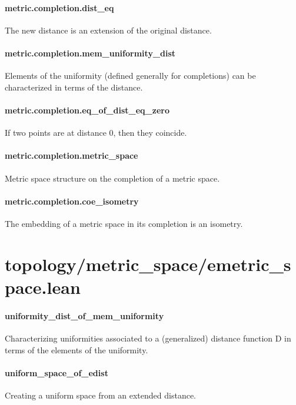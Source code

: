 \documentclass{article}
\begin{document}
\paragraph{metric.completion.dist\_eq}
\par
The new distance is an extension of the original distance.
\paragraph{metric.completion.mem\_uniformity\_dist}
\par
Elements of the uniformity (defined generally for completions) can be characterized in terms
of the distance.
\paragraph{metric.completion.eq\_of\_dist\_eq\_zero}
\par
If two points are at distance 0, then they coincide.
\paragraph{metric.completion.metric\_space}
\par
Metric space structure on the completion of a metric space.
\paragraph{metric.completion.coe\_isometry}
\par
The embedding of a metric space in its completion is an isometry.
\section{topology/metric\_space/emetric\_space.lean}\paragraph{uniformity\_dist\_of\_mem\_uniformity}
\par
Characterizing uniformities associated to a (generalized) distance function 
\colorbox[RGB]{253,246,227}{{{{\color[RGB]{101, 123, 131} D }}}}in terms of the elements of the uniformity.
\paragraph{uniform\_space\_of\_edist}
\par
Creating a uniform space from an extended distance.
\end{document}
